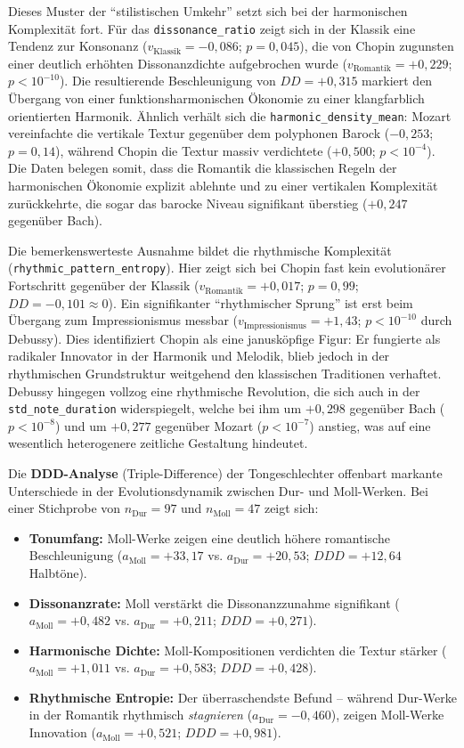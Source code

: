 \documentclass[10pt,a4paper]{article}
\theoremstyle{definition}
\begin{document}
Dieses Muster der \enquote{stilistischen Umkehr} setzt sich bei der harmonischen Komplexität fort. Für das \texttt{dissonance\_ratio} zeigt sich in der Klassik eine Tendenz zur Konsonanz ($v_{\text{Klassik}} = -0{,}086$; $p=0{,}045$), die von Chopin zugunsten einer deutlich erhöhten Dissonanzdichte aufgebrochen wurde ($v_{\text{Romantik}} = +0{,}229$; $p<10^{-10}$). Die resultierende Beschleunigung von $DD = +0{,}315$ markiert den Übergang von einer funktionsharmonischen Ökonomie zu einer klangfarblich orientierten Harmonik. Ähnlich verhält sich die \texttt{harmonic\_density\_mean}: Mozart vereinfachte die vertikale Textur gegenüber dem polyphonen Barock ($-0{,}253$; $p=0{,}14$), während Chopin die Textur massiv verdichtete ($+0{,}500$; $p<10^{-4}$). Die Daten belegen somit, dass die Romantik die klassischen Regeln der harmonischen Ökonomie explizit ablehnte und zu einer vertikalen Komplexität zurückkehrte, die sogar das barocke Niveau signifikant überstieg ($+0{,}247$ gegenüber Bach).

Die bemerkenswerteste Ausnahme bildet die rhythmische Komplexität (\texttt{rhythmic\_pattern\_entropy}). Hier zeigt sich bei Chopin fast kein evolutionärer Fortschritt gegenüber der Klassik ($v_{\text{Romantik}} = +0{,}017$; $p=0{,}99$; $DD = -0{,}101 \approx 0$). Ein signifikanter \enquote{rhythmischer Sprung} ist erst beim Übergang zum Impressionismus messbar ($v_{\text{Impressionismus}} = +1{,}43$; $p<10^{-10}$ durch Debussy). Dies identifiziert Chopin als eine janusköpfige Figur: Er fungierte als radikaler Innovator in der Harmonik und Melodik, blieb jedoch in der rhythmischen Grundstruktur weitgehend den klassischen Traditionen verhaftet. Debussy hingegen vollzog eine rhythmische Revolution, die sich auch in der \texttt{std\_note\_duration} widerspiegelt, welche bei ihm um $+0{,}298$ gegenüber Bach ($p<10^{-8}$) und um $+0{,}277$ gegenüber Mozart ($p<10^{-7}$) anstieg, was auf eine wesentlich heterogenere zeitliche Gestaltung hindeutet.

Die \textbf{DDD-Analyse} (Triple-Difference) der Tongeschlechter offenbart markante Unterschiede in der Evolutionsdynamik zwischen Dur- und Moll-Werken. Bei einer Stichprobe von $n_{\text{Dur}}=97$ und $n_{\text{Moll}}=47$ zeigt sich:


\begin{itemize}
    \item \textbf{Tonumfang:} Moll-Werke zeigen eine deutlich höhere romantische Beschleunigung ($a_{\text{Moll}}=+33{,}17$ vs. $a_{\text{Dur}}=+20{,}53$; $DDD=+12{,}64$ Halbtöne).
    \item \textbf{Dissonanzrate:} Moll verstärkt die Dissonanzzunahme signifikant ($a_{\text{Moll}}=+0{,}482$ vs. $a_{\text{Dur}}=+0{,}211$; $DDD=+0{,}271$).
    \item \textbf{Harmonische Dichte:} Moll-Kompositionen verdichten die Textur stärker ($a_{\text{Moll}}=+1{,}011$ vs. $a_{\text{Dur}}=+0{,}583$; $DDD=+0{,}428$).
    \item \textbf{Rhythmische Entropie:} Der überraschendste Befund -- während Dur-Werke in der Romantik rhythmisch \emph{stagnieren} ($a_{\text{Dur}}=-0{,}460$), zeigen Moll-Werke Innovation ($a_{\text{Moll}}=+0{,}521$; $DDD=+0{,}981$).
\end{itemize}
\end{document}
